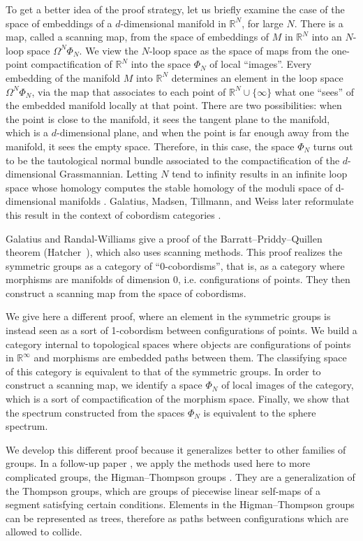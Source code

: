 \documentclass[12pt]{amsart}
\theoremstyle{plain}
\theoremstyle{definition}
\theoremstyle{remark}
\begin{document}
To get a better idea of the proof strategy, let us briefly examine the case of the space of embeddings of a $d$-dimensional manifold in $\mathbb{R}^N$, for large $N$.
There is a map, called a scanning map, from the space of embeddings of $M$ in $\mathbb{R}^N$ into an $N$-loop space $\Omega^N\Phi_N$. 
We view the $N$-loop space as the space of maps from the one-point compactification of $\mathbb{R}^N$ into the space $\Phi_N$ of local ``images''. 
Every embedding of the manifold $M$ into $\mathbb{R}^N$ determines an element in the loop space $\Omega^N\Phi_N$, via the map that associates to each point of $\mathbb{R}^N\cup\{\infty\}$ what one ``sees'' of the embedded manifold locally at that point. 
There are two possibilities: when the point is close to the manifold, it sees the tangent plane to the manifold, which is a $d$-dimensional plane, and when the point is far enough away from the manifold, it sees the empty space.  
Therefore, in this case, the space $\Phi_N$ turns out to be the tautological normal bundle associated to the compactification of the $d$-dimensional Grassmannian.
Letting $N$ tend to infinity results in an infinite loop space whose homology computes the stable homology of the moduli space of d-dimensional manifolds \cite{gmtw,grwI}.
Galatius, Madsen, Tillmann, and Weiss later reformulate this result in the context of cobordism categories \cite{gmtw}.

Galatius and Randal-Williams give a proof of the Barratt--Priddy--Quillen theorem \cite{sorenrwModuliMonoids} (Hatcher~\cite{hatcherMW}), which also uses scanning methods. 
This proof realizes the symmetric groups as a category of ``0-cobordisms'', that is, as a category where morphisms are manifolds of dimension 0, i.e. configurations of points. 
They then construct a scanning map from the space of cobordisms.

We give here a different proof, where an element in the symmetric groups is instead seen as a sort of 1-cobordism between configurations of points. 
We build a category internal to topological spaces where objects are configurations of points in $\mathbb{R}^\infty$ and morphisms are embedded paths between them. 
The classifying space of this category is equivalent to that of the symmetric groups. 
In order to construct a scanning map, we identify a space $\Phi_N$ of local images of the category, which is a sort of compactification of the morphism space.
Finally, we show that the spectrum constructed from the spaces $\Phi_N$ is equivalent to the sphere spectrum.

We develop this different proof because it generalizes better to other families of groups. 
In a follow-up paper \cite{delarue1}, we apply the methods used here to more complicated groups, the Higman--Thompson groups \cite{higman}. 
They are a generalization of the Thompson groups, which are groups of piecewise linear self-maps of a segment satisfying certain conditions.
Elements in the Higman--Thompson groups can be represented as trees, therefore as paths between configurations which are allowed to collide.
\end{document}
